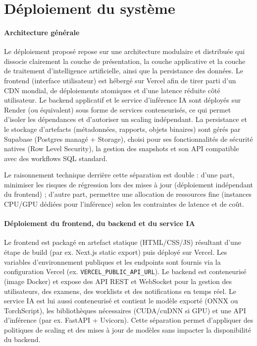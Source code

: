 \section{Déploiement du système}

\paragraph{Architecture générale}
Le déploiement proposé repose sur une architecture modulaire et distribuée qui dissocie clairement la couche de présentation, la couche applicative et la couche de traitement d'intelligence artificielle, ainsi que la persistance des données. Le frontend (interface utilisateur) est hébergé sur Vercel afin de tirer parti d'un CDN mondial, de déploiements atomiques et d'une latence réduite côté utilisateur. Le backend applicatif et le service d'inférence IA sont déployés sur Render (ou équivalent) sous forme de services conteneurisés, ce qui permet d'isoler les dépendances et d'autoriser un scaling indépendant. La persistance et le stockage d'artefacts (métadonnées, rapports, objets binaires) sont gérés par Supabase (Postgres managé + Storage), choisi pour ses fonctionnalités de sécurité natives (Row Level Security), la gestion des snapshots et son API compatible avec des workflows SQL standard.

Le raisonnement technique derrière cette séparation est double : d'une part, minimiser les risques de régression lors des mises à jour (déploiement indépendant du frontend) ; d'autre part, permettre une allocation de ressources fine (instances CPU/GPU dédiées pour l'inférence) selon les contraintes de latence et de coût.

\paragraph{Déploiement du frontend, du backend et du service IA}
Le frontend est packagé en artefact statique (HTML/CSS/JS) résultant d'une étape de build (par ex. Next.js static export) puis déployé sur Vercel. Les variables d'environnement publiques et les endpoints sont fournis via la configuration Vercel (ex. \texttt{VERCEL_PUBLIC_API_URL}). Le backend est conteneurisé (image Docker) et expose des API REST et WebSocket pour la gestion des utilisateurs, des examens, des worklists et des notifications en temps réel. Le service IA est lui aussi conteneurisé et contient le modèle exporté (ONNX ou TorchScript), les bibliothèques nécessaires (CUDA/cuDNN si GPU) et une API d'inférence (par ex. FastAPI + Uvicorn). Cette séparation permet d'appliquer des politiques de scaling et des mises à jour de modèles sans impacter la disponibilité du backend.

